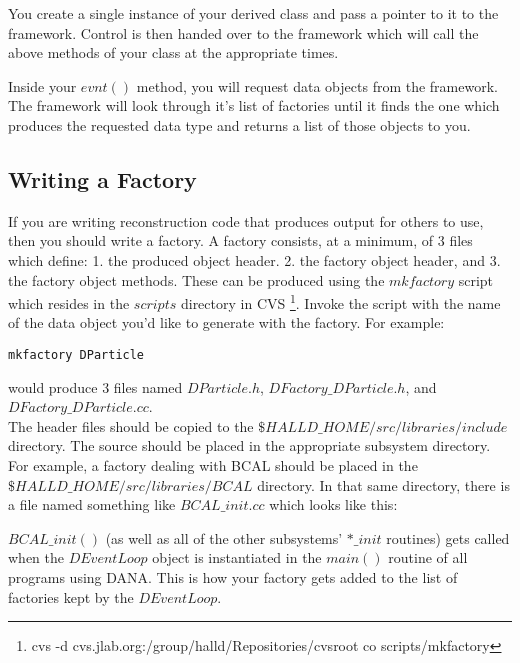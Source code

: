 \documentclass[12pt]{article}
\begin{document}
You create a single instance of your derived class and pass a pointer
to it to the framework. Control is then
handed over to the framework which will call the above methods of your
class at the appropriate times.

Inside your $evnt()$ method, you will request data objects from the 
framework. The framework will look through it's list of factories
until it finds the one which produces the requested data type and returns
a list of those objects to you.

\subsection{Writing a Factory}
\label{factory}
If you are writing reconstruction code that produces output for others
to use, then you should write a factory. A factory consists, at a
minimum, of 3 files which define: 1. the produced object header.
2. the factory object header, and  3. the factory object methods.
These can be produced using the $mkfactory$ script which resides in
the $scripts$ directory in CVS
\footnote{cvs -d cvs.jlab.org:/group/halld/Repositories/cvsroot co scripts/mkfactory}.
Invoke the script with the name of the data object you'd like to
generate with the factory. For example:

\begin{lstlisting}[frame=shadowbox,backgroundcolor=\color{cmdbkgd}]
mkfactory DParticle
\end{lstlisting}

would produce 3 files named $DParticle.h$, $DFactory\_DParticle.h$,
and $DFactory\_DParticle.cc$.\\

The header files should be copied to the $\$HALLD\_HOME/src/libraries/include$
directory. The source should be placed in the appropriate subsystem
directory. For example, a factory dealing with BCAL should be placed
in the $\$HALLD\_HOME/src/libraries/BCAL$ directory. In that same
directory, there is a file named something like $BCAL\_init.cc$
which looks like this:



$BCAL\_init()$ (as well as all of the other subsystems' $*\_init$
routines) gets called when the $DEventLoop$ object is instantiated in
the $main()$ routine of all programs using DANA. This is how your
factory gets added to the list of factories kept by the $DEventLoop$.\\
\end{document}
